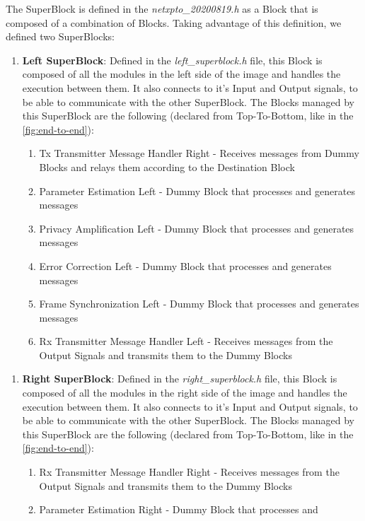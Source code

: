 \begin{refsection}
The SuperBlock is defined in the \textit{netxpto\_20200819.h} as a Block that is 
composed of a combination of Blocks. Taking advantage of this definition, we 
defined two SuperBlocks:
\begin{enumerate}
	\item \textbf{Left SuperBlock}: Defined in the \textit{left\_superblock.h} file, 
		this Block is composed of all the modules in the left side of the image 
		and handles the execution between them. It also connects to it's Input 
		and Output signals, to be able to communicate with the other SuperBlock. 
		The Blocks managed by this SuperBlock are the following (declared from 
		Top-To-Bottom, like in the \autoref{fig:end-to-end}):
		\begin{enumerate}
			\item Tx Transmitter Message Handler Right - Receives messages from 
				Dummy Blocks and relays them according to the Destination Block
			\item Parameter Estimation Left - Dummy Block that processes and 
				generates messages
			\item Privacy Amplification Left - Dummy Block that processes and 
				generates messages
			\item Error Correction Left - Dummy Block that processes and 
				generates messages
			\item Frame Synchronization Left - Dummy Block that processes and 
				generates messages
			\item Rx Transmitter Message Handler Left - Receives messages from 
				the Output Signals and transmits them to the Dummy Blocks
		\end{enumerate}
\end{enumerate}
\begin{enumerate}
	\item \textbf{Right SuperBlock}: Defined in the \textit{right\_superblock.h} 
		file, this Block is composed of all the modules in the right side of 
		the image and handles the execution between them. It also connects to 
		it's Input and Output signals, to be able to communicate with the other 
		SuperBlock. The Blocks managed by this SuperBlock are the following 
		(declared from Top-To-Bottom, like in the \autoref{fig:end-to-end}):
		\begin{enumerate}
			\item Rx Transmitter Message Handler Right - Receives messages from 
				the Output Signals and transmits them to the Dummy Blocks
			\item Parameter Estimation Right - Dummy Block that processes and 

\end{enumerate}
\end{enumerate}
\end{refsection}

